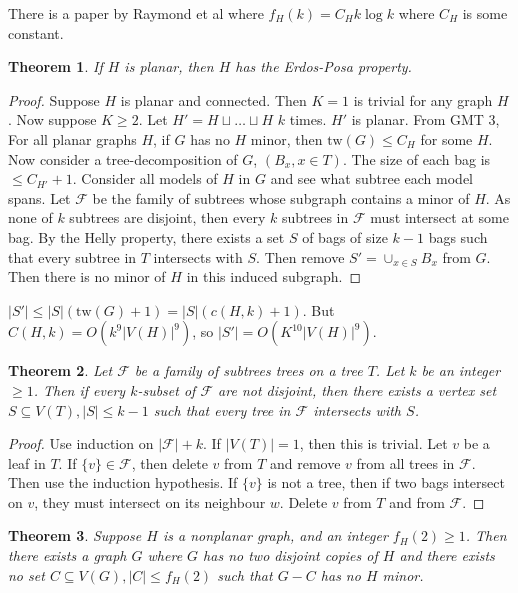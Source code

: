 \documentclass[]{article}
\newcommand{\tw}{\text{tw}}
\newtheorem{theorem}{Theorem}
\theoremstyle{definition}
\numberwithin{theorem}{section}
\numberwithin{equation}{section}
\begin{document}
There is a paper by Raymond et al where $f_H(k) = C_H k \log k$ where $C_H$ is some constant. 

\begin{theorem}
	If $H$ is planar, then $H$ has the Erdos-Posa property.
\end{theorem}
\begin{proof}
	Suppose $H$ is planar and connected. Then $K = 1$ is trivial for any graph $H$. Now suppose $K \geq 2$. Let $H' = H \sqcup \ldots \sqcup H$ $k$ times. $H'$ is planar. From GMT 3, For all planar graphs $H$, if $G$ has no $H$ minor, then $\tw(G) \leq C_H$ for some $H$. Now consider a tree-decomposition of $G$, $(B_x, x \in T)$. The size of each bag is $\leq C_{H'} + 1$. Consider all models of $H$ in $G$ and see what subtree each model spans. Let $\mathcal{F}$ be the family of subtrees whose subgraph contains a minor of $H$. As none of $k$ subtrees are disjoint, then every $k$ subtrees in $\mathcal{F}$ must intersect at some bag. By the Helly property, there exists a set $S$ of bags of size $k - 1$ bags such that every subtree in $T$ intersects with $S$. Then remove $S' = \cup_{x \in S} B_x$ from $G$. Then there is no minor of $H$ in this induced subgraph. 
\end{proof}
$|S'| \leq |S| (\tw(G) + 1) = |S|(c(H, k) + 1)$. But $C(H, k) = O(k^9 |V(H)|^9)$, so $|S'| = O(K^{10} |V(H)|^9)$. 

\begin{theorem}
	Let $\mathcal{F}$ be a family of subtrees trees on a tree $T$. Let $k$ be an integer $\geq 1$. Then if every $k$-subset of $\mathcal{F}$ are not disjoint, then there exists a vertex set $S \subseteq V(T), |S| \leq k - 1$ such that every tree in $\mathcal{F}$ intersects with $S$.
\end{theorem}
\begin{proof}
	Use induction on $|\mathcal{F}| + k$. If $|V(T)| = 1$, then this is trivial. Let $v$ be a leaf in $T$. If $\{v\} \in \mathcal{F}$, then delete $v$ from $T$ and remove $v$ from all trees in $\mathcal{F}$. Then use the induction hypothesis. If $\{v\}$ is not a tree, then if two bags intersect on $v$, they must intersect on its neighbour $w$. Delete $v$ from $T$ and from $\mathcal{F}$.
\end{proof}

\begin{theorem}
	Suppose $H$ is a nonplanar graph, and an integer $f_H(2) \geq 1$. Then there exists a graph $G$ where $G$ has no two disjoint copies of $H$ and there exists no set $C \subseteq V(G), |C| \leq f_H(2)$ such that $G - C$ has no $H$ minor. 
\end{theorem}
\end{document}
